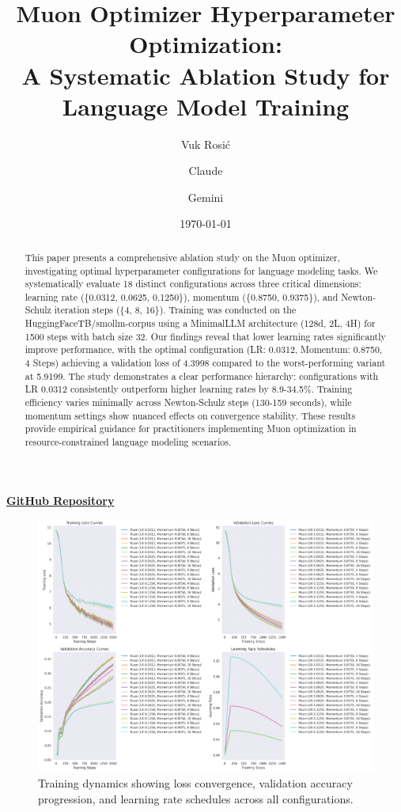 \documentclass[11pt,a4paper]{article}
\title{\Large\bfseries Muon Optimizer Hyperparameter Optimization:\\[0.3em]
\large A Systematic Ablation Study for Language Model Training}
\author[1]{Vuk Rosić}
\author[2]{Claude}
\author[3]{Gemini}
\affil[1]{Óbuda University, \texttt{vukrosic1@gmail.com}}
\affil[2]{Anthropic}
\affil[3]{Google}
\date{\today}
\begin{document}
\maketitle

\begin{center}
\textbf{\href{https://github.com/vukrosic/muon-optimizer-study}{GitHub Repository}}
\end{center}

\begin{abstract}
This paper presents a comprehensive ablation study on the Muon optimizer, investigating optimal hyperparameter configurations for language modeling tasks. We systematically evaluate 18 distinct configurations across three critical dimensions: learning rate (\{0.0312, 0.0625, 0.1250\}), momentum (\{0.8750, 0.9375\}), and Newton-Schulz iteration steps (\{4, 8, 16\}). Training was conducted on the HuggingFaceTB/smollm-corpus using a MinimalLLM architecture (128d, 2L, 4H) for 1500 steps with batch size 32. Our findings reveal that lower learning rates significantly improve performance, with the optimal configuration (LR: 0.0312, Momentum: 0.8750, 4 Steps) achieving a validation loss of 4.3998 compared to the worst-performing variant at 5.9199. The study demonstrates a clear performance hierarchy: configurations with LR 0.0312 consistently outperform higher learning rates by 8.9-34.5\%. Training efficiency varies minimally across Newton-Schulz steps (130-159 seconds), while momentum settings show nuanced effects on convergence stability. These results provide empirical guidance for practitioners implementing Muon optimization in resource-constrained language modeling scenarios.
\end{abstract}

\begin{figure}[H]
    \centering
    \includegraphics[width=\textwidth]{images/training_curves.png}
    \caption{Training dynamics showing loss convergence, validation accuracy progression, and learning rate schedules across all configurations.}
\end{figure}
\end{document}
